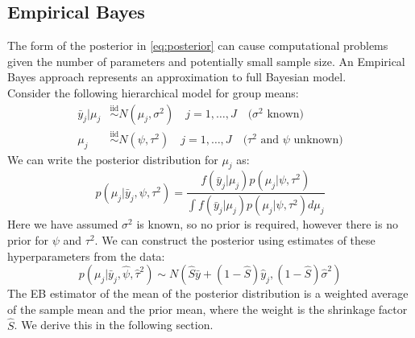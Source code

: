 \documentclass[DIV=14,titlepage=false]{scrreprt}
\begin{document}
\subsection{Empirical Bayes}
The form of the posterior in \eqref{eq:posterior} can cause computational problems given the number of parameters and potentially small sample size. An Empirical Bayes approach represents an approximation to full Bayesian model.\\
Consider the following hierarchical model for group means:
\begin{align*}
    \bar y_j | \mu_j &\overset{\text{iid}}{\sim} N(\mu_j, \sigma^2) \quad j=1, \ldots, J \quad \text{($\sigma^2$ known)}\\
    \mu_j & \overset{\text{iid}}{\sim} N(\psi, \tau^2) \quad j=1, \ldots, J \quad \text{($\tau^2$ and $\psi$ unknown)}
\end{align*}
We can write the posterior distribution for $\mu_j$ as:
\[
    p(\mu_j|\bar y_j, \psi, \tau^2) = \frac{f(\bar y_j|\mu_j)p(\mu_j|\psi, \tau^2)}{\int f(\bar y_j|\mu_j)p(\mu_j|\psi, \tau^2)d\mu_j}
\]
Here we have assumed $\sigma^2$ is known, so no prior is required, however there is no prior for $\psi$ and $\tau^2$. We can construct the posterior using estimates of these hyperparameters from the data:
\[
    p(\mu_j|\bar y_j, \hat \psi, \hat \tau^2) \sim N (\hat S \bar y + (1-\hat S)\hat y_j, (1-\hat S)\hat \sigma^2)
\]
The EB estimator of the mean of the posterior distribution is a weighted average of the sample mean and the prior mean, where the weight is the shrinkage factor $\hat S$. We derive this in the following section.
\end{document}
